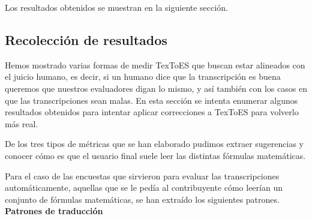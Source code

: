 Los resultados obtenidos se muestran en la siguiente sección.


\subsection{Recolección de resultados}

Hemos mostrado varias formas de medir TexToES que buscan estar alineados con el juicio humano, es decir, si un humano dice que la transcripción es buena queremos que nuestros evaluadores digan lo mismo, y así también con los casos en que las transcripciones sean malas. En esta sección se intenta enumerar algunos resultados obtenidos para intentar aplicar correcciones a TexToES para volverlo más real.

De los tres tipos de métricas que se han elaborado pudimos extraer sugerencias y conocer cómo es que el usuario final suele leer las distintas fórmulas matemáticas.

Para el caso de las encuestas que sirvieron para evaluar las transcripciones automáticamente, aquellas que se le pedía al contribuyente cómo leerían un conjunto de fórmulas matemáticas, se han extraído los siguientes patrones.\\

{\Large \textbf{Patrones de traducción}}\\

